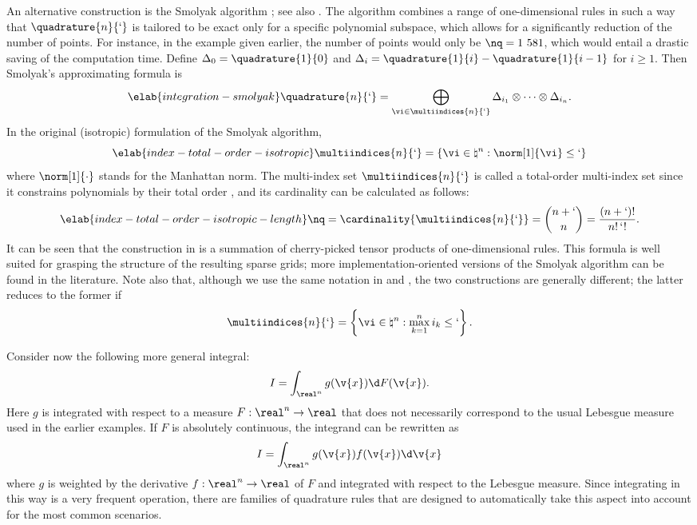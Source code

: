 An alternative construction is the Smolyak algorithm \cite{smolyak1963}; see
also \cite{eldred2008, heiss2008, maitre2010}. The algorithm combines a range of
one-dimensional rules in such a way that $\quadrature{n}{\lq}$ is tailored to be
exact only for a specific polynomial subspace, which allows for a significantly
reduction of the number of points. For instance, in the example given earlier,
the number of points would only be $\nq = 1~581$, which would entail a drastic
saving of the computation time. Define $\Delta_0 = \quadrature{1}{0}$ and
$\Delta_i = \quadrature{1}{i} - \quadrature{1}{i - 1}$ for $i \geq 1$. Then
Smolyak's approximating formula is
\begin{equation} \elab{integration-smolyak}
  \quadrature{n}{\lq} = \bigoplus_{\vi \in \multiindices{n}{\lq}} \Delta_{i_1} \otimes \cdots \otimes \Delta_{i_n}.
\end{equation}
In the original (isotropic) formulation of the Smolyak algorithm,
\begin{equation} \elab{index-total-order-isotropic}
  \multiindices{n}{\lq} = \left\{ \vi \in \natural^n: \norm[1]{\vi} \leq \lq \right\}
\end{equation}
where $\norm[1]{\cdot}$ stands for the Manhattan norm. The multi-index set
$\multiindices{n}{\lq}$ is called a total-order multi-index set since it
constrains polynomials by their total order \cite{eldred2008, beck2011}, and its
cardinality can be calculated as follows:
\begin{equation} \elab{index-total-order-isotropic-length}
  \nq = \cardinality{\multiindices{n}{\lq}} = {n + \lq \choose n} = \frac{(n + \lq)!}{n! \, \lq!}.
\end{equation}
It can be seen that the construction in  is a
summation of cherry-picked tensor products of one-dimensional rules. This
formula is well suited for grasping the structure of the resulting sparse grids;
more implementation-oriented versions of the Smolyak algorithm can be found in
the literature. Note also that, although we use the same notation in
 and , the two constructions
are generally different; the latter reduces to the former if
\[
  \multiindices{n}{\lq} = \left\{ \vi \in \natural^n: \max_{k = 1}^n i_k \leq \lq \right\}.
\]

Consider now the following more general integral:
\[
  I = \int_{\real^n} g(\v{x}) \d F(\v{x}).
\]
Here $g$ is integrated with respect to a measure $F: \real^n \to \real$
\cite{durrett2010} that does not necessarily correspond to the usual Lebesgue
measure used in the earlier examples. If $F$ is absolutely continuous, the
integrand can be rewritten as
\[
  I = \int_{\real^n} g(\v{x}) f(\v{x}) \d \v{x}
\]
where $g$ is weighted by the derivative $f: \real^n \to \real$ of $F$ and
integrated with respect to the Lebesgue measure. Since integrating in this way
is a very frequent operation, there are families of quadrature rules that are
designed to automatically take this aspect into account for the most common
scenarios.

